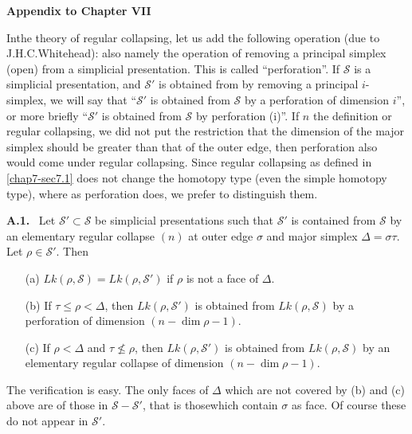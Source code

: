 \newpage

\thispagestyle{plain}

\begin{center}
{\Large\bf Appendix to Chapter VII}
\end{center}


In\pageoriginale the theory of regular collapsing, let us add the following operation (due to J.H.C.\@ Whitehead): also namely the operation of removing a principal simplex (open) from a simplicial presentation. This is called ``perforation''. If $\mathscr{S}$ is a simplicial presentation, and $\mathscr{S}'$ is obtained from by removing a principal $i$-simplex, we will say that ``$\mathscr{S}'$ is obtained from $\mathscr{S}$ by a perforation of dimension $i$'', or more briefly ``$\mathscr{S}'$ is obtained from $\mathscr{S}$ by perforation (i)''. If $n$ the definition or regular collapsing, we did not put the restriction that the dimension of the major simplex should be greater than that of the outer edge, then perforation also would come under regular collapsing. Since regular collapsing as defined in \ref{chap7-sec7.1} does not change the homotopy type (even the simple homotopy type), where as perforation does, we prefer to distinguish them.

\medskip
\noindent
{\bf A.1.}~ Let $\mathscr{S}'\subset \mathscr{S}$ be simplicial presentations such that $\mathscr{S}'$ is contained from $\mathscr{S}$ by an elementary regular collapse $(n)$ at outer edge $\sigma$ and major simplex $\Delta=\sigma\tau$. Let $\rho\in\mathscr{S}'$. Then 
\begin{itemize}
\item[(a)] $Lk(\rho,\mathscr{S})=Lk(\rho,\mathscr{S}')$ if $\rho$ is not a face of $\Delta$.

\item[(b)] If $\tau\leq \rho<\Delta$, then $Lk(\rho,\mathscr{S}')$ is obtained from $Lk(\rho,\mathscr{S})$ by a perforation of dimension $(n-\dim\rho-1)$.

\item[(c)] If $\rho<\Delta$ and $\tau\not\leq \rho$, then $Lk(\rho,\mathscr{S}')$ is obtained from $Lk(\rho,\mathscr{S})$ by an elementary regular collapse of dimension $(n-\dim \rho-1)$.
\end{itemize}

The verification is easy. The only faces of $\Delta$ which are not covered by (b) and (c) above are of those in $\mathscr{S}-\mathscr{S}'$, that is those\pageoriginale which contain $\sigma$ as face. Of course these do not appear in $\mathscr{S}'$.

